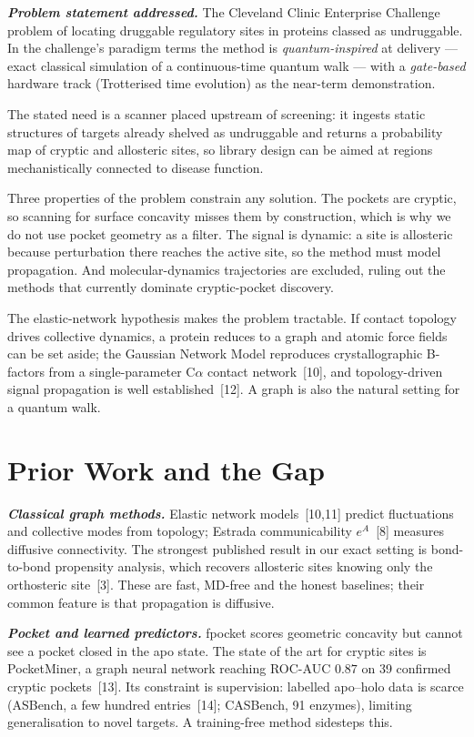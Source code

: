 \documentclass[10pt,a4paper]{article}
\newcommand{\lead}[1]{\textbf{\textit{#1}}}
\begin{document}
\lead{Problem statement addressed.} The Cleveland Clinic Enterprise Challenge problem of locating
druggable regulatory sites in proteins classed as undruggable. In the challenge's paradigm terms the
method is \emph{quantum-inspired} at delivery --- exact classical simulation of a continuous-time
quantum walk --- with a \emph{gate-based} hardware track (Trotterised time evolution) as the near-term
demonstration.

The stated need is a scanner placed upstream of screening: it ingests static structures of targets
already shelved as undruggable and returns a probability map of cryptic and allosteric sites, so
library design can be aimed at regions mechanistically connected to disease function.

Three properties of the problem constrain any solution. The pockets are cryptic, so scanning for
surface concavity misses them by construction, which is why we do not use pocket geometry as a
filter. The signal is dynamic: a site is allosteric because perturbation there reaches the active
site, so the method must model propagation. And molecular-dynamics trajectories are excluded, ruling
out the methods that currently dominate cryptic-pocket discovery.

The elastic-network hypothesis makes the problem tractable. If contact topology drives collective
dynamics, a protein reduces to a graph and atomic force fields can be set aside; the Gaussian Network
Model reproduces crystallographic B-factors from a single-parameter C$\alpha$ contact
network~[10], and topology-driven signal propagation is well
established~[12]. A graph is also the natural setting for a quantum walk.

\section{Prior Work and the Gap}

\lead{Classical graph methods.} Elastic network models~[10,11] predict
fluctuations and collective modes from topology; Estrada communicability
$e^{A}$~[8] measures diffusive connectivity. The strongest published result in our
exact setting is bond-to-bond propensity analysis, which recovers allosteric sites knowing only the
orthosteric site~[3]. These are fast, MD-free and the honest baselines; their common
feature is that propagation is diffusive.

\lead{Pocket and learned predictors.} fpocket scores geometric concavity but cannot see a pocket
closed in the apo state. The state of the art for cryptic sites is PocketMiner, a graph neural
network reaching ROC-AUC $0.87$ on 39 confirmed cryptic pockets~[13]. Its constraint is
supervision: labelled apo--holo data is scarce (ASBench, a few hundred
entries~[14]; CASBench, 91 enzymes), limiting generalisation to
novel targets. A training-free method sidesteps this.
\end{document}
